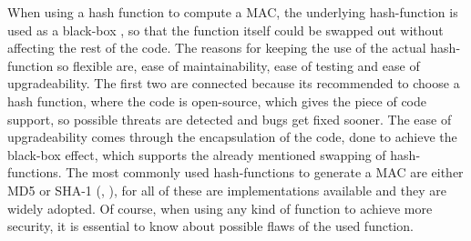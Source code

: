 When using a hash function to compute a MAC, the underlying hash-function is used as a black-box \cite{KHF}, so that the function itself could be swapped out without affecting the rest of the code. The reasons for keeping the use of the actual hash-function so flexible are, ease of maintainability, ease of testing and ease of upgradeability. The first two are connected because its recommended to choose a hash function, where the code is open-source, which gives the piece of code support, so possible threats are detected and bugs get fixed sooner. The ease of upgradeability comes through the encapsulation of the code, done to achieve the black-box effect, which supports the already mentioned swapping of hash-functions.
The most commonly used hash-functions to generate a MAC are either MD5 or SHA-1 (\cite{CRY-MD5}, \cite{NPC}), for all of these are implementations available and they are widely adopted. Of course, when using any kind of function to achieve more security, it is essential to know about possible flaws of the used function. \\
